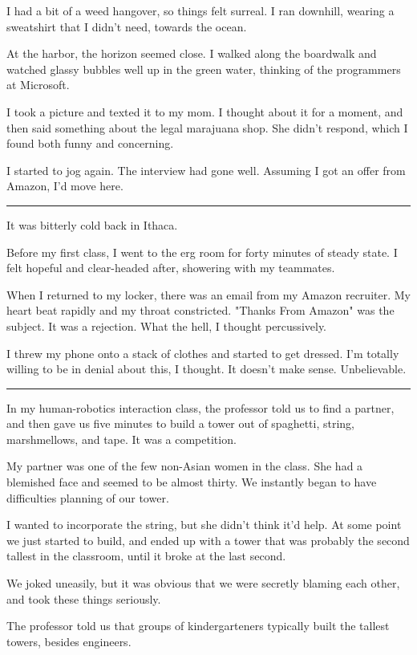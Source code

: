 I had a bit of a weed hangover, so things felt surreal.  I ran downhill, wearing
a sweatshirt that I didn't need, towards the ocean.

At the harbor, the horizon seemed close.  I walked along the boardwalk and
watched glassy bubbles well up in the green water, thinking of the programmers
at Microsoft. 

I took a picture and texted it to my mom.  I thought about it for a moment, and
then said something about the legal marajuana shop.  She didn't respond, which I
found both funny and concerning. 

I started to jog again.  The interview had gone well.  Assuming I got an
offer from Amazon, I'd move here. 

\plainfancybreak{12pt}{2}{* * *}

It was bitterly cold back in Ithaca.

Before my first class, I went to the erg room for forty minutes of steady state.
I felt hopeful and clear-headed after, showering with my teammates.

When I returned to my locker, there was an email from my Amazon recruiter.  My
heart beat rapidly and my throat constricted.  "Thanks From Amazon" was the
subject.  It was a rejection.  What the hell, I thought percussively. 

I threw my phone onto a stack of clothes and started to get dressed.  I'm
totally willing to be in denial about this, I thought.  It doesn't make sense.
Unbelievable. 

\plainfancybreak{12pt}{2}{* * *}

In my human-robotics interaction class, the professor told us to find a partner,
and then gave us five minutes to build a tower out of spaghetti, string,
marshmellows, and tape.  It was a competition.

My partner was one of the few non-Asian women in the class.  She had a blemished
face and seemed to be almost thirty.  We instantly began to have difficulties
planning of our tower.  

I wanted to incorporate the string, but she didn't think it'd help.  At some
point we just started to build, and ended up with a tower that was probably the
second tallest in the classroom, until it broke at the last second.

We joked uneasily, but it was obvious that we were secretly blaming each other,
and took these things seriously.

The professor told us that groups of kindergarteners typically built the tallest
towers, besides engineers.

